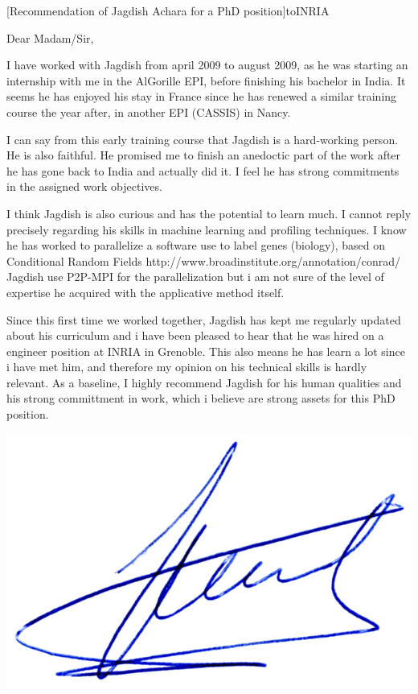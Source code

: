 \documentclass[a4paper,10pt]{article}
\begin{document}

\begin{letter}[Recommendation of Jagdish Achara for a PhD position]{to}{INRIA}

Dear Madam/Sir, 

I have worked with Jagdish from april 2009 to august 2009, as he was
starting an internship with me in the AlGorille EPI, before finishing 
his bachelor in India. It seems he has enjoyed his stay in France since 
he has renewed a similar training course the year after, in another EPI (CASSIS) in Nancy. 

I can say from this early training course that Jagdish is a
hard-working person. He is also faithful. He promised me to finish an anedoctic
part of the work after he has gone back to India and actually did it. I
feel he has strong commitments in the assigned work objectives.

I think Jagdish is also curious and has the potential to learn much. I
cannot reply precisely regarding his skills in machine learning and
profiling techniques. I know he has worked to parallelize a software
use to label genes (biology), based on Conditional Random Fields
http://www.broadinstitute.org/annotation/conrad/
Jagdish use P2P-MPI for the parallelization but i am not sure of the
level of expertise he acquired with the applicative method itself.


Since this first time we worked together, Jagdish has kept me regularly 
updated about his curriculum and i have been pleased to hear that he was
hired on a engineer position at INRIA in Grenoble. This also means he has 
learn a lot since i have met him, and therefore my opinion on his technical
skills is hardly relevant. As a baseline, I highly recommend Jagdish for 
his human qualities and his strong committment in work, which i believe
are strong assets for this PhD position.


\end{letter}
\begin{flushright}
\includegraphics[width=.26\textwidth]{signgenaud.jpg}
\end{flushright}
%
%
\end{document}
